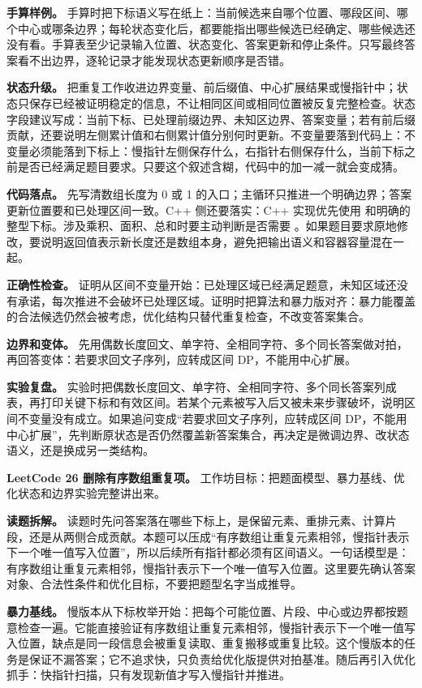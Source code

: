 \textbf{手算样例。} 手算时把下标语义写在纸上：当前候选来自哪个位置、哪段区间、哪个中心或哪条边界；每轮状态变化后，都要能指出哪些候选已经确定、哪些候选还没有看。手算表至少记录输入位置、状态变化、答案更新和停止条件。只写最终答案看不出边界，逐轮记录才能发现状态更新顺序是否错。

\textbf{状态升级。} 把重复工作收进边界变量、前后缀值、中心扩展结果或慢指针中；状态只保存已经被证明稳定的信息，不让相同区间或相同位置被反复完整检查。状态字段建议写成：当前下标、已处理前缀边界、未知区边界、答案变量；若有前后缀贡献，还要说明左侧累计值和右侧累计值分别何时更新。不变量要落到代码上：不变量必须能落到下标上：慢指针左侧保存什么，右指针右侧保存什么，当前下标之前是否已经满足题目要求。只要这个叙述含糊，代码中的加一减一就会变成猜。

\textbf{代码落点。} 先写清数组长度为 0 或 1 的入口；主循环只推进一个明确边界；答案更新位置要和已处理区间一致。C++ 侧还要落实：C++ 实现优先使用  和明确的整型下标。涉及乘积、面积、总和时要主动判断是否需要 。如果题目要求原地修改，要说明返回值表示新长度还是数组本身，避免把输出语义和容器容量混在一起。

\textbf{正确性检查。} 证明从区间不变量开始：已处理区域已经满足题意，未知区域还没有承诺，每次推进不会破坏已处理区域。证明时把算法和暴力版对齐：暴力能覆盖的合法候选仍然会被考虑，优化结构只替代重复检查，不改变答案集合。

\textbf{边界和变体。} 先用偶数长度回文、单字符、全相同字符、多个同长答案做对拍，再回答变体：若要求回文子序列，应转成区间 DP，不能用中心扩展。

\textbf{实验复盘。} 实验时把偶数长度回文、单字符、全相同字符、多个同长答案列成表，再打印关键下标和有效区间。若某个元素被写入后又被未来步骤破坏，说明区间不变量没有成立。如果追问变成“若要求回文子序列，应转成区间 DP，不能用中心扩展”，先判断原状态是否仍然覆盖新答案集合，再决定是微调边界、改状态语义，还是换成另一类结构。

\noindent\textbf{LeetCode 26 删除有序数组重复项。} 工作坊目标：把题面模型、暴力基线、优化状态和边界实验完整讲出来。

\textbf{读题拆解。} 读题时先问答案落在哪些下标上，是保留元素、重排元素、计算片段，还是从两侧合成贡献。本题可以压成“有序数组让重复元素相邻，慢指针表示下一个唯一值写入位置”，所以后续所有指针都必须有区间语义。一句话模型是：有序数组让重复元素相邻，慢指针表示下一个唯一值写入位置。这里要先确认答案对象、合法性条件和优化目标，不要把题型名字当成推导。

\textbf{暴力基线。} 慢版本从下标枚举开始：把每个可能位置、片段、中心或边界都按题意检查一遍。它能直接验证有序数组让重复元素相邻，慢指针表示下一个唯一值写入位置，缺点是同一段信息会被重复读取、重复搬移或重复比较。这个慢版本的任务是保证不漏答案；它不追求快，只负责给优化版提供对拍基准。随后再引入优化抓手：快指针扫描，只有发现新值才写入慢指针并推进。

